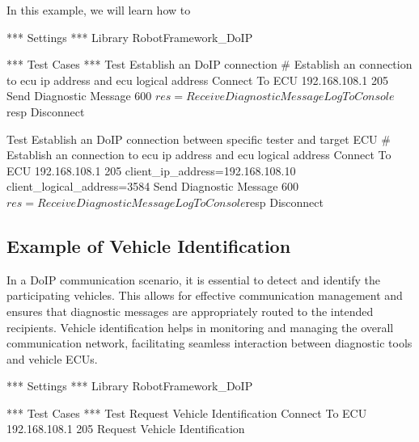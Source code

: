     In this example, we will learn how to 

    \begin{robotcode}
*** Settings ***
Library    RobotFramework_DoIP

*** Test Cases ***
Test Establish an DoIP connection
    # Establish an connection to ecu ip address and ecu logical address
    Connect To ECU     192.168.108.1      205
    Send Diagnostic Message     600
    ${res}= Receive Diagnostic Message
    Log To Console    ${resp}
    Disconnect

Test Establish an DoIP connection between specific tester and target ECU 
    # Establish an connection to ecu ip address and ecu logical address
    Connect To ECU     192.168.108.1      205       client_ip_address=192.168.108.10    client_logical_address=3584
    Send Diagnostic Message     600
    ${res}= Receive Diagnostic Message
    Log To Console    ${resp}
    Disconnect
    \end{robotcode}

    \subsection{Example of Vehicle Identification}

    In a DoIP communication scenario, it is essential to detect and identify the participating vehicles. This allows for 
    effective communication management and ensures that diagnostic messages are appropriately routed to the intended recipients. 
    Vehicle identification helps in monitoring and managing the overall communication network, facilitating seamless interaction 
    between diagnostic tools and vehicle ECUs.

    \begin{robotcode}
*** Settings ***
Library    RobotFramework_DoIP

*** Test Cases ***
Test Request Vehicle Identification
    Connect To ECU     192.168.108.1      205
    Request Vehicle Identification 

    \end{robotcode}


